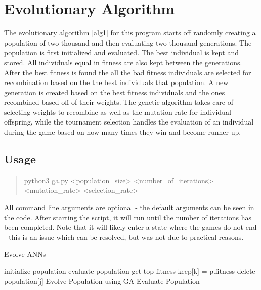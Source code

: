 \section{Evolutionary Algorithm}
The evolutionary algorithm \ref{alg1} for this program starts off randomly creating a population of two thousand and then evaluating two thousand generations. The population is first initialized and evaluated. The best individual is kept and stored. All individuals equal in fitness are also kept between the generations. After the best fitness is found the all the bad fitness individuals are selected for recombination based on the the best individuals that population. A new generation is created based on the best fitness individuals and the ones recombined based off of their weights. The genetic algorithm takes care of selecting weights to recombine as well as the mutation rate for individual offspring, while the tournament selection handles the evaluation of an individual during the game based on how many times they win and become runner up.

\subsection{Usage}

\begin{quote}

python3 ga.py <population_size> <number_of_iterations> <mutation_rate> <selection_rate>

\end{quote} 

All command line arguments are optional - the default arguments can be seen in the code.  After starting the script, it will run until the number of iterations has been completed.  Note that it will likely enter a state where the games do not end - this is an issue which can be resolved, but was not due to practical reasons.

\begin{algorithm} [tbh]                     %
\caption{Evolve ANNs}          %
\label{alg1}                           %
\begin{algorithmic}                    %
    \STATE initialize population
    \STATE evaluate population
    	\STATE get top fitness
    				\STATE keep[k] = p.fitness
    			\ENDIF
    		\ENDFOR
    	\ENDFOR
    			\STATE delete population[j]
    		\ENDIF
    	\ENDFOR
    	\STATE Evolve Population using GA
    	\STATE Evaluate Population
    \ENDFOR
\end{algorithmic}
\end{algorithm}

